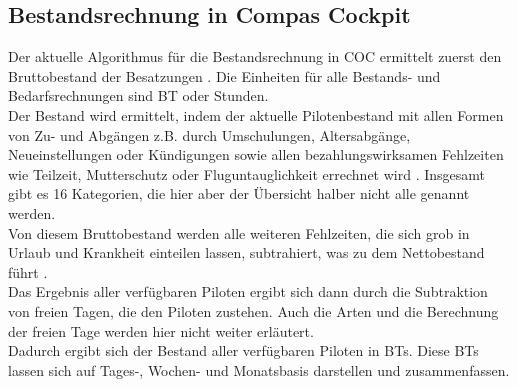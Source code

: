 \documentclass [12pt, a4paper, oneside, titlepage, ngerman]{article}
\begin{document}
\subsection{Bestandsrechnung in Compas Cockpit} \label{bestandsrechnung}
Der aktuelle Algorithmus für die Bestandsrechnung in \ac{COC} ermittelt zuerst den Bruttobestand der Besatzungen \cite[vgl.][S.8]{capfunc}. Die Einheiten für alle Bestands- und Bedarfsrechnungen sind \ac{BT} oder Stunden. \\
Der Bestand wird ermittelt, indem der aktuelle Pilotenbestand mit allen Formen von Zu- und Abgängen z.B. durch Umschulungen, Altersabgänge, Neueinstellungen oder Kündigungen sowie allen bezahlungswirksamen Fehlzeiten wie Teilzeit, Mutterschutz oder Fluguntauglichkeit errechnet wird \cite[vgl.][S.19]{benutzerhandbuch}. Insgesamt gibt es 16 Kategorien, die hier aber der Übersicht halber nicht alle genannt werden. \\
Von diesem Bruttobestand werden alle weiteren Fehlzeiten, die sich grob in Urlaub und Krankheit einteilen lassen, subtrahiert, was zu dem Nettobestand führt \cite[vgl.][S.8]{capfunc}. \\
Das Ergebnis aller verfügbaren Piloten ergibt sich dann durch die Subtraktion von freien Tagen, die den Piloten zustehen. Auch die Arten und die Berechnung der freien Tage werden hier nicht weiter erläutert. \\
Dadurch ergibt sich der Bestand aller verfügbaren Piloten in \acp{BT}. Diese \acp{BT} lassen sich auf Tages-, Wochen- und Monatsbasis darstellen und zusammenfassen. 
\end{document}
